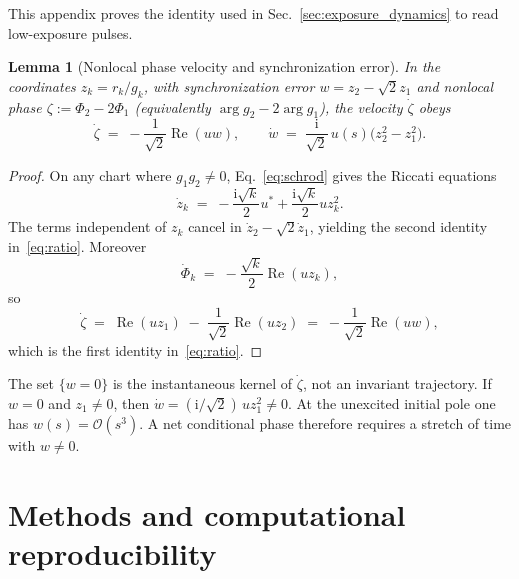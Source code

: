 \documentclass[aps,prx,reprint,nofootinbib,longbibliography,floatfix]{revtex4-2}
\newtheorem{lemma}{Lemma}
\theoremstyle{plain}
\theoremstyle{remark}
\newcommand{\ii}{\mathrm{i}}
\begin{document}
This appendix proves the identity used in Sec.~\ref{sec:exposure_dynamics} to read low-exposure pulses.

\begin{lemma}[Nonlocal phase velocity and synchronization error]
\label{lem:ratio}
In the coordinates $z_k=r_k/g_k$, with synchronization error $w=z_2-\sqrt{2}z_1$ and nonlocal phase $\zeta:=\Phi_2-2\Phi_1$ (equivalently $\arg g_2-2\arg g_1$), the velocity $\dot\zeta$ obeys
\begin{equation}
\dot{\zeta}
\;=\;
-\frac{1}{\sqrt{2}}\operatorname{Re}(u w),
\qquad
\dot{w}
\;=\;
\frac{\ii}{\sqrt{2}}\,u(s)\bigl(z_2^2-z_1^2\bigr).
\label{eq:ratio}
\end{equation}
\end{lemma}
\begin{proof}
On any chart where $g_1g_2\ne0$, Eq.~\eqref{eq:schrod} gives the Riccati equations
\begin{equation}
\dot z_k \;=\; -\frac{\ii\sqrt{k}}{2}u^*
+\frac{\ii\sqrt{k}}{2}u z_k^2.
\end{equation}
The terms independent of $z_k$ cancel in $\dot z_2-\sqrt{2}\dot z_1$, yielding the second identity in~\eqref{eq:ratio}. Moreover
\begin{equation}
\dot\Phi_k
\;=\;
-\frac{\sqrt{k}}{2}\operatorname{Re}(u z_k),
\end{equation}
so
\begin{equation}
\dot\zeta
\;=\;
\operatorname{Re}(u z_1)
\;-\;
\frac{1}{\sqrt{2}}\operatorname{Re}(u z_2)
\;=\;
-\frac{1}{\sqrt{2}}\operatorname{Re}(u w),
\end{equation}
which is the first identity in~\eqref{eq:ratio}.
\end{proof}
The set $\{w=0\}$ is the instantaneous kernel of $\dot\zeta$, not an invariant trajectory. If $w=0$ and $z_1\neq 0$, then $\dot w=(\ii/\sqrt{2})\,u z_1^2\neq 0$. At the unexcited initial pole one has $w(s)=\mathcal{O}(s^3)$. A net conditional phase therefore requires a stretch of time with $w\neq 0$.

\section{Methods and computational reproducibility}
\label{sec:methods}
\end{document}
